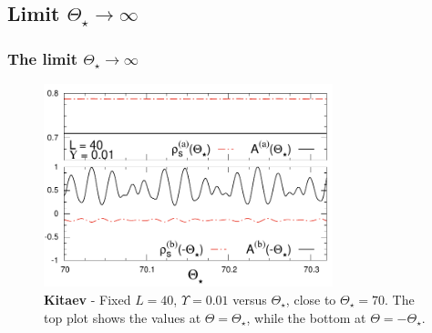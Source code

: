 \subsection{Limit $\Theta_\star \to \infty$}

\begin{frame}	
	\frametitle{The limit $\Theta_\star \to \infty$}

		\begin{figure}
   			\includegraphics[width=8.4cm]{paper/diffThstaru001T70l40.pdf}
  			\caption{ {\bf Kitaev} - Fixed $L = 40$, $\Upsilon = 0.01$ versus
    			$\Theta_\star$, close to $\Theta_\star = 70$.  The top plot shows 
    			the
    			values at $\Theta=\Theta_\star$, while the bottom
    			 at $\Theta=-\Theta_\star$. }
			\label{roundtripDiffThetaAR}
		\end{figure}

\end{frame}

